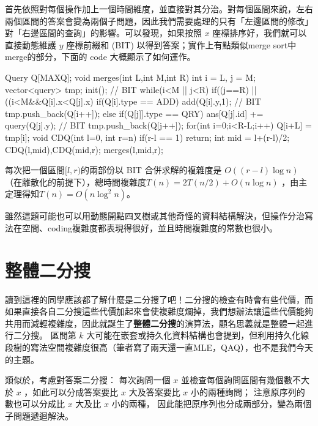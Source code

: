 \documentclass[main.tex]{subfiles}
\begin{document}
首先依照對每個操作加上一個時間維度，並直接對其分治。對每個區間來說，左右兩個區間的答案會變為兩個子問題，因此我們需要處理的只有「左邊區間的修改」對「右邊區間的查詢」的影響。可以發現，如果按照 $x$ 座標排序好，我們就可以直接動態維護 $y$ 座標前綴和 (BIT) 以得到答案；實作上有點類似merge sort中merge的部分，下面的 code 大概顯示了如何運作。

\begin{C++}
Query Q[MAXQ];
void merges(int L,int M,int R){
	int i = L, j = M;
	vector<query> tmp;
	init(); // BIT
	while(i<M || j<R){
		if((j==R) || ((i<M&&Q[i].x<Q[j].x){
			if(Q[i].type == ADD)
				add(Q[i].y,1); // BIT
			tmp.push_back(Q[i++]);	
		}else{
			if(Q[j]].type == QRY)
				ans[Q[j].id] += query(Q[j].y); // BIT
			tmp.push_back(Q[j++]);
		}
	}
	for(int i=0;i<R-L;i++)
		Q[i+L] = tmp[i];
}
void CDQ(int l=0, int r=n){
	if(r-l == 1) return;
	int mid = l+(r-l)/2;
	CDQ(l,mid),CDQ(mid,r);
	merges(l,mid,r);
}
\end{C++}

每次把一個區間$[l,r)$的兩部份以 BIT 合併求解的複雜度是 $O((r-l)\log n)$ （在離散化的前提下），總時間複雜度$T(n)=2T(n/2)+O(n\log n)$ ，由主定理得知$T(n)=O(n\log^2n)$。

雖然這題可能也可以用動態開點四叉樹或其他奇怪的資料結構解決，但操作分治寫法在空間、coding複雜度都表現得很好，並且時間複雜度的常數也很小。

\section{整體二分搜}
讀到這裡的同學應該都了解什麼是二分搜了吧！二分搜的檢查有時會有些代價，而如果直接各自二分搜這些代價加起來會使複雜度爛掉，我們想辦法讓這些代價能夠共用而減輕複雜度，因此就誕生了\textbf{整體二分搜}的演算法，顧名思義就是整體一起進行二分搜。
區間第 $k$ 大可能在嵌套或持久化資料結構也會提到，但利用持久化線段樹的寫法空間複雜度很高（筆者寫了兩天還一直MLE，QAQ），也不是我們今天的主題。

類似於，考慮對答案二分搜：
每次詢問一個 $x$ 並檢查每個詢問區間有幾個數不大於 $x$ ，如此可以分成答案要比 $x$ 大及答案要比 $x$ 小的兩種詢問；
注意原序列的數也可以分成比 $x$ 大及比 $x$ 小的兩種，
因此能把原序列也分成兩部分，變為兩個子問題遞迴解決。
\end{document}
